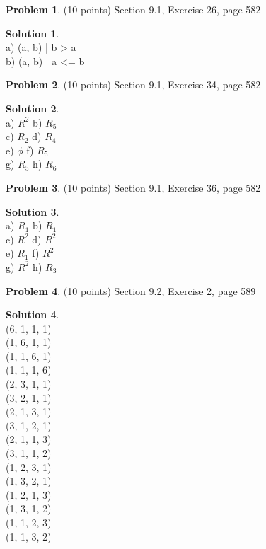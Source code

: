 \documentclass{article}
\theoremstyle{definition}
\newtheorem{problem}{Problem}
\newtheorem*{solution}{Solution}
\begin{document}
\begin{problem} (10 points)
Section 9.1, Exercise 26, page 582
\end{problem}
\begin{solution}~\\
a) {(a, b) | b > a} \\
b) {(a, b) | a <= b} \\
\end{solution}

\begin{problem} (10 points)
Section 9.1, Exercise 34, page 582
\end{problem}
\begin{solution}~\\
a) $R^{2}$ \indent b) $R_{5}$ \\
c) $R_{2}$ \indent d) $R_{4}$ \\
e) $\phi$  \indent f) $R_{5}$ \\ 
g) $R_{5}$ \indent h) $R_{6}$ \\
\end{solution}

\begin{problem} (10 points)
Section 9.1, Exercise 36, page 582
\end{problem}
\begin{solution}~\\
a) $R_{1}$ \indent b) $R_{1}$ \\
c) $R^{2}$ \indent d) $R^{2}$ \\
e) $R_{1}$ \indent f) $R^{2}$ \\
g) $R^{2}$ \indent h) $R_{3}$ \\
\end{solution}



\begin{problem} (10 points)
Section 9.2, Exercise 2, page 589
\end{problem}
\begin{solution} ~\\
(6, 1, 1, 1) \\
(1, 6, 1, 1) \\
(1, 1, 6, 1) \\
(1, 1, 1, 6) \\
(2, 3, 1, 1) \\
(3, 2, 1, 1) \\
(2, 1, 3, 1) \\
(3, 1, 2, 1) \\
(2, 1, 1, 3) \\
(3, 1, 1, 2) \\
(1, 2, 3, 1) \\
(1, 3, 2, 1) \\
(1, 2, 1, 3) \\
(1, 3, 1, 2) \\
(1, 1, 2, 3) \\
(1, 1, 3, 2) \\
\end{solution}
\end{document}
